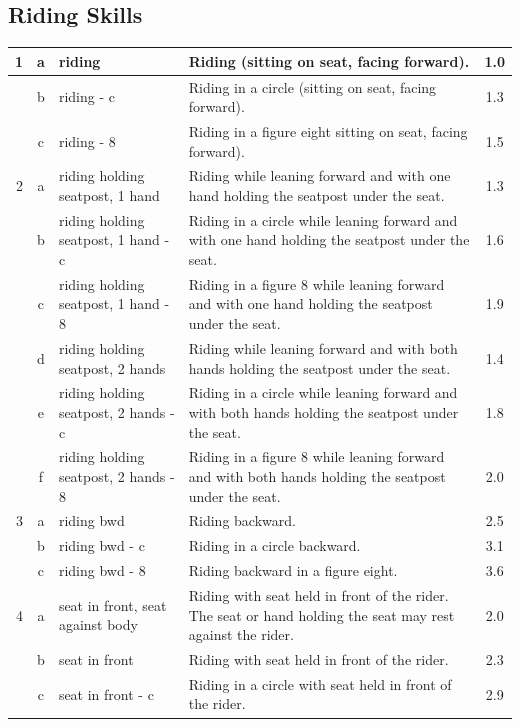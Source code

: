 \subsection{Riding Skills}
\renewcommand{\arraystretch}{1.5}
\begin{longtable}{|r|c|p{4cm}|p{8cm}|c|}
\hline
1 & a & riding  & Riding (sitting on seat, facing forward). & 1.0 \\ 
\hline
  & b & riding - c  & Riding in a circle (sitting on seat, facing forward). & 1.3 \\ 
\hline
  & c & riding - 8  & Riding in a figure eight sitting on seat, facing forward).  & 1.5 \\ 
\hline
2 & a & riding holding seatpost, 1 hand & Riding while leaning forward and with one hand holding the seatpost under the seat. & 1.3 \\ 
\hline
  & b & riding holding seatpost, 1 hand - c & Riding in a circle while leaning forward and with one hand holding the seatpost under the seat. & 1.6 \\ 
\hline
  & c & riding holding seatpost, 1 hand - 8 & Riding in a figure 8 while leaning forward and with one hand holding the seatpost under the seat. & 1.9 \\ 
\hline
  & d & riding holding seatpost, 2 hands  & Riding while leaning forward and with both hands holding the seatpost under the seat. & 1.4 \\ 
\hline
  & e & riding holding seatpost, 2 hands - c  & Riding in a circle while leaning forward and with both hands holding the seatpost under the seat. & 1.8 \\ 
\hline
  & f & riding holding seatpost, 2 hands - 8  & Riding in a figure 8 while leaning forward and with both hands holding the seatpost under the seat. & 2.0 \\ 
\hline
3 & a & riding bwd  & Riding backward.  & 2.5 \\ 
\hline
  & b & riding bwd - c  & Riding in a circle backward.  & 3.1 \\ 
\hline
  & c & riding bwd - 8  & Riding backward in a figure eight.  & 3.6 \\ 
\hline
4 & a & seat in front, seat against body  & Riding with seat held in front of the rider. The seat or hand holding the seat may rest against the rider.  & 2.0 \\ 
\hline
  & b & seat in front & Riding with seat held in front of the rider.  & 2.3 \\ 
\hline
  & c & seat in front - c & Riding in a circle with seat held in front of the rider.  & 2.9 \\ 

\end{longtable}
